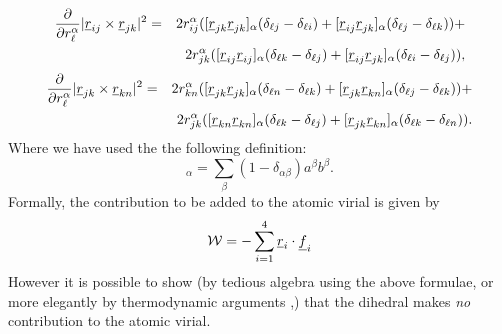 \begin{eqnarray}
\frac{\partial}{\partial r_{\ell}^{\alpha}}
|\mbox{$\underline{r}$}_{ij}\times\mbox{$\underline{r}$}_{jk}|^{2}&=&
2r_{ij}^{\alpha}([\mbox{$\underline{r}$}_{jk}\mbox{$\underline{r}$}_{jk}]_{\alpha}(\delta_{\ell
j}-\delta_{\ell i}) +[\mbox{$\underline{r}$}_{ij}\mbox{$\underline{r}$}_{jk}]_{\alpha}(\delta_{\ell
j}-\delta_{\ell k}))+\nonumber \\ & &
2r_{jk}^{\alpha}([\mbox{$\underline{r}$}_{ij}\mbox{$\underline{r}$}_{ij}]_{\alpha}(\delta_{\ell
k}-\delta_{\ell j}) +[\mbox{$\underline{r}$}_{ij}\mbox{$\underline{r}$}_{jk}]_{\alpha}(\delta_{\ell
i}-\delta_{\ell j})),
\end{eqnarray}
\begin{eqnarray}
\frac{\partial}{\partial r_{\ell}^{\alpha}}
|\mbox{$\underline{r}$}_{jk}\times\mbox{$\underline{r}$}_{kn}|^{2}&=&
2r_{kn}^{\alpha}([\mbox{$\underline{r}$}_{jk}\mbox{$\underline{r}$}_{jk}]_{\alpha}(\delta_{\ell
n}-\delta_{\ell k}) +[\mbox{$\underline{r}$}_{jk}\mbox{$\underline{r}$}_{kn}]_{\alpha}(\delta_{\ell
j}-\delta_{\ell k}))+\nonumber \\ & &
2r_{jk}^{\alpha}([\mbox{$\underline{r}$}_{kn}\mbox{$\underline{r}$}_{kn}]_{\alpha}(\delta_{\ell
k}-\delta_{\ell j}) +[\mbox{$\underline{r}$}_{jk}\mbox{$\underline{r}$}_{kn}]_{\alpha}(\delta_{\ell
k}-\delta_{\ell n})).
\end{eqnarray}
\vskip 2mm
Where we have used the the following definition:
\begin{equation}
[\vek{a} ~
\vek{b}]_{\alpha}=\sum_{\beta}(1-\delta_{\alpha\beta})a^{\beta}b^{\beta}.
\end{equation}
Formally, the contribution to be added to the atomic virial is given
by
\begin{equation}
{\cal W}=-\sum_{i=1}^{4}\mbox{$\underline{r}$}_{i}\cdot\mbox{$\underline{f}$}_{i}
\end{equation}
However it is possible to show (by tedious algebra using the above
formulae, or more elegantly by thermodynamic arguments
\cite{smith-93c},) that the dihedral makes {\em no} contribution to
the atomic virial.

